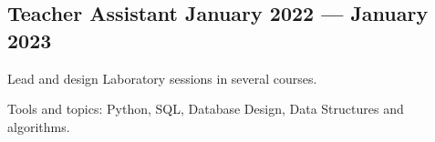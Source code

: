 \documentclass[letter,10pt]{article}
\begin{document}









\subsection{{Teacher Assistant \hfill January 2022 --- January 2023}}

\begin{zitemize}
\item Lead and design Laboratory sessions in several courses. 
\item Tools and topics: Python, SQL, Database Design, Data Structures and algorithms.
\end{zitemize}

\end{document}
